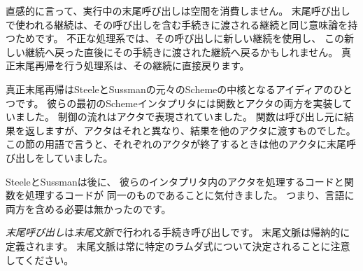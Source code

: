 \begin{rationale}

直感的に言って、実行中の末尾呼び出しは空間を消費しません。
末尾呼び出しで使われる継続は、その呼び出しを含む手続きに渡される継続と同じ意味論を持つためです。
不正な処理系では、その呼び出しに新しい継続を使用し、
この新しい継続へ戻った直後にその手続きに渡された継続へ戻るかもしれません。
真正末尾再帰を行う処理系は、その継続に直接戻ります。

真正末尾再帰はSteeleとSussmanの元々のSchemeの中核となるアイディアのひとつです。
彼らの最初のSchemeインタプリタには関数とアクタの両方を実装していました。
制御の流れはアクタで表現されていました。
関数は呼び出し元に結果を返しますが、アクタはそれと異なり、結果を他のアクタに渡すものでした。
この節の用語で言うと、それぞれのアクタが終了するときは他のアクタに末尾呼び出しをしていました。

SteeleとSussmanは後に、
彼らのインタプリタ内のアクタを処理するコードと関数を処理するコードが
同一のものであることに気付きました。
つまり、言語に両方を含める必要は無かったのです。

\end{rationale}

{\em 末尾呼び出し}は{\em 末尾文脈}で行われる手続き呼び出しです。
末尾文脈は帰納的に定義されます。
末尾文脈は常に特定のラムダ式について決定されることに注意してください。

